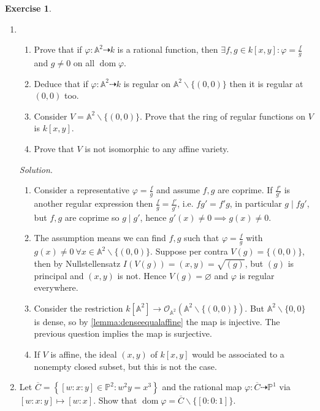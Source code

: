 \documentclass{article}
\newcommand{\A}{\mathbb{A}}
\newcommand{\p}{\mathbb{P}}
\newcommand{\dom}{\operatorname{dom}}
\theoremstyle{definition}
\newtheorem{exe}[defn]{Exercise}
\newtheorem{remark}[defn]{Remark}
\begin{document}
\begin{exe}
\begin{enumerate}
\begin{enumerate}
\begin{remark}
There are indeed nonregular rational maps from, for example, $\p^2$, e.g. $\psi:\p^2\dashrightarrow\p^2:[x:y:z]\mapsto [yz:zx:xy]$ is not regular at $[1:0:0],[0:1:0]$ and $[0:0:1]$.
\end{remark}
\end{enumerate}
\item \begin{enumerate}
\item Prove that if $\varphi:\A^2\dashrightarrow k$ is a rational function, then $\exists f,g\in k[x,y]:\varphi=\frac{f}{g}$ and $g\neq 0$ on all $\dom\varphi$.
\item Deduce that if $\varphi:\A^2\dashrightarrow k$ is regular on $\A^2\backslash\{(0,0)\}$ then it is regular at $(0,0)$ too.
\item Consider $V=\A^2\backslash\{(0,0)\}$. Prove that the ring of regular functions on $V$ is $k[x,y]$.
\item Prove that $V$ is not isomorphic to any affine variety.
\end{enumerate}
\textit{Solution}. \begin{enumerate}
\item Consider a representative $\varphi=\frac{f}{g}$ and assume $f,g$ are coprime. If $\frac{f'}{g'}$ is another regular expression then $\frac{f}{g}=\frac{f'}{g'}$, i.e. $fg'=f'g$, in particular $g\mid fg'$, but $f,g$ are coprime so $g\mid g'$, hence $g'(x)\neq 0\implies g(x)\neq 0$.
\item The assumption means we can find $f,g$ such that $\varphi=\frac{f}{g}$ with $g(x)\neq 0 \ \forall x\in\A^2\backslash\{(0,0)\}$. Suppose per contra $V(g)=\{(0,0)\}$, then by Nullstellensatz $I(V(g))=(x,y)=\sqrt{(g)}$, but $(g)$ is principal and $(x,y)$ is not. Hence $V(g)=\varnothing$ and $\varphi$ is regular everywhere.
\item Consider the restriction $k[\A^2]\rightarrow\mathcal O_{\A^2}(\A^2\backslash\{(0,0)\})$. But $\A^2\backslash\{0,0\}$ is dense, so by \ref{lemma:denseequalaffine} the map is injective. The previous question implies the map is surjective.
\item If $V$ is affine, the ideal $(x,y)$ of $k[x,y]$ would be associated to a nonempty closed subset, but this is not the case.
\end{enumerate}
\item Let $\overline C=\left\{[w:x:y]\in\p^2:w^2y=x^3\right\}$ and the rational map $\varphi:\overline C\dashrightarrow\p^1$ via $[w:x:y]\mapsto [w:x]$. Show that $\dom\varphi=\overline C\backslash\{[0:0:1]\}$.


\end{enumerate}
\end{exe}
\end{document}
